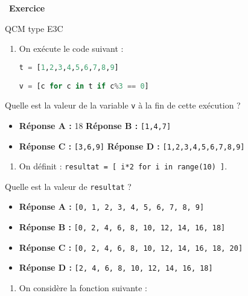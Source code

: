 \documentclass[
  11pt,
]{article}
\newcommand{\passthrough}[1]{#1}
\providecommand{\tightlist}{%
  \setlength{\itemsep}{0pt}\setlength{\parskip}{0pt}}
\newcounter{exo}
\newenvironment{exercice}[1]
{\par \medskip   \addtocounter{exo}{1} \noindent  
\begin{bclogo}[arrondi =0.1,   noborder = true, logo=\bccrayon, marge=4]{~\textbf{Exercice} \textbf{\theexo} {\itshape #1} }  \par}
{
\end{bclogo}
 \par \bigskip }
\newcounter{def}
\begin{document}
\begin{exercice}{}

QCM type E3C

\begin{enumerate}
\def\labelenumi{\arabic{enumi}.}
\item
  On exécute le code suivant :

\begin{lstlisting}[language=Python]
t = [1,2,3,4,5,6,7,8,9]

v = [c for c in t if c%3 == 0]
\end{lstlisting}
\end{enumerate}

Quelle est la valeur de la variable \passthrough{\lstinline!v!} à la fin
de cette exécution ?

\begin{itemize}
\tightlist
\item
  \textbf{Réponse A :} 18 \textbf{Réponse B :}
  \passthrough{\lstinline![1,4,7]!}
\item
  \textbf{Réponse C :} \passthrough{\lstinline![3,6,9]!} \textbf{Réponse
  D :} \passthrough{\lstinline![1,2,3,4,5,6,7,8,9]!}
\end{itemize}

\begin{enumerate}
\def\labelenumi{\arabic{enumi}.}
\setcounter{enumi}{1}
\tightlist
\item
  On définit :
  \passthrough{\lstinline!resultat = [ i*2 for i in range(10) ]!}.
\end{enumerate}

Quelle est la valeur de \passthrough{\lstinline!resultat!} ?

\begin{itemize}
\tightlist
\item
  \textbf{Réponse A :}
  \passthrough{\lstinline![0, 1, 2, 3, 4, 5, 6, 7, 8, 9]!}
\item
  \textbf{Réponse B :}
  \passthrough{\lstinline![0, 2, 4, 6, 8, 10, 12, 14, 16, 18]!}
\item
  \textbf{Réponse C :}
  \passthrough{\lstinline![0, 2, 4, 6, 8, 10, 12, 14, 16, 18, 20]!}
\item
  \textbf{Réponse D :}
  \passthrough{\lstinline![2, 4, 6, 8, 10, 12, 14, 16, 18]!}
\end{itemize}

\begin{enumerate}
\def\labelenumi{\arabic{enumi}.}
\setcounter{enumi}{2}
\tightlist
\item
  On considère la fonction suivante :
\end{enumerate}


\end{exercice}
\end{document}
